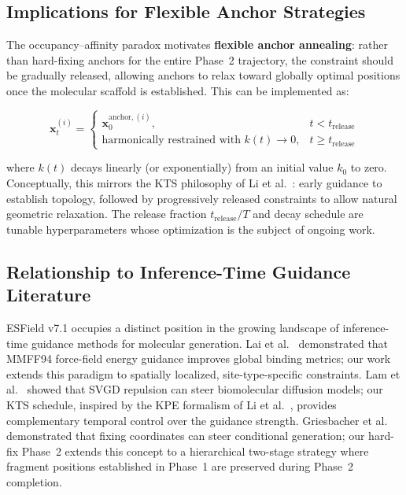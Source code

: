 \documentclass[11pt,letterpaper]{article}
\begin{document}
\subsection{Implications for Flexible Anchor Strategies}

The occupancy--affinity paradox motivates \textbf{flexible anchor annealing}: rather
than hard-fixing anchors for the entire Phase~2 trajectory, the constraint should
be gradually released, allowing anchors to relax toward globally optimal
positions once the molecular scaffold is established.  This can be implemented
as:

\begin{equation}\label{eq:annealing}
\mathbf{x}_t^{(i)} = \begin{cases}
  \mathbf{x}_0^{\text{anchor},(i)}, & t < t_{\text{release}} \\[4pt]
  \text{harmonically restrained with } k(t) \rightarrow 0, & t \ge t_{\text{release}}
\end{cases}
\end{equation}

where $k(t)$ decays linearly (or exponentially) from an initial value $k_0$ to
zero.  Conceptually, this mirrors the KTS philosophy of Li et
al.~\cite{li2026kpe}: early guidance to establish topology, followed by
progressively released constraints to allow natural geometric relaxation.  The
release fraction $t_{\text{release}} / T$ and decay schedule are tunable
hyperparameters whose optimization is the subject of ongoing work.

\subsection{Relationship to Inference-Time Guidance Literature}

ESField v7.1 occupies a distinct position in the growing landscape of
inference-time guidance methods for molecular generation.  Lai et
al.~\cite{lai2025force} demonstrated that MMFF94 force-field energy guidance
improves global binding metrics; our work extends this paradigm to spatially
localized, site-type-specific constraints.  Lam et al.~\cite{lam2026metadiffusion}
showed that SVGD repulsion can steer biomolecular diffusion models; our KTS
schedule, inspired by the KPE formalism of Li et al.~\cite{li2026kpe}, provides
complementary temporal control over the guidance strength.  Griesbacher et
al.~\cite{griesbacher2026ebmol} demonstrated that fixing coordinates can steer
conditional generation; our hard-fix Phase~2 extends this concept to a
hierarchical two-stage strategy where fragment positions established in Phase~1
are preserved during Phase~2 completion.
\end{document}

